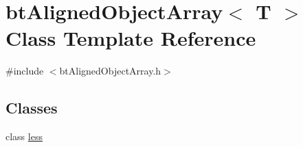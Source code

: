 \hypertarget{classbt_aligned_object_array}{\section{bt\+Aligned\+Object\+Array$<$ T $>$ Class Template Reference}
\label{classbt_aligned_object_array}
}


{\ttfamily \#include $<$bt\+Aligned\+Object\+Array.\+h$>$}

\subsection*{Classes}
\begin{DoxyCompactItemize}
\item 
class \hyperlink{classbt_aligned_object_array_1_1less}{less}
\end{DoxyCompactItemize}
